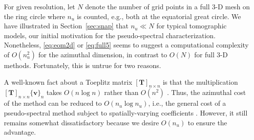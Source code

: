 \documentclass[extra,referee]{gji}
\begin{document}
For given resolution, let $N$ denote the number of grid points 
in a full 3-D mesh on the ring circle where $n_u$ is counted, 
e.g., both at the equatorial great circle.   
We have illustrated in Section~\ref{sec:snap} that $n_u \ll N$
for typical tomographic models, 
our initial motivation for the pseudo-spectral characterization. 
Nonetheless, \eqref{eq:eom2d} or \eqref{eq:full5} seems to suggest a 
computational complexity of $O\left(n_u^2\right)$ for the azimuthal dimension, 
in contrast to $O\left(N\right)$ for full 3-D methods. 
Fortunately, this is untrue for two reasons.

A well-known fact about a Toeplitz matrix $[\mathbf{T}]_{n\times n}$ 
is that the multiplication $[\mathbf{T}]_{n\times n}\{\mathbf{v}\}_n$ 
takes $O\left(n\log n\right)$ rather than $O\left(n^2\right)$ \cite[Chap 4,][]{golub2012matrix}. 
Thus, the azimuthal cost of the method can be reduced to 
$O\left(n_u\log n_u\right)$, i.e., the general cost of a pseudo-spectral method
subject to spatially-varying coefficients \cite[Chap 9,][]{boyd2001spectral}.
However, it still remains somewhat dissatisfactory 
because we desire $O\left(n_u\right)$ to ensure the advantage. 
\end{document}
